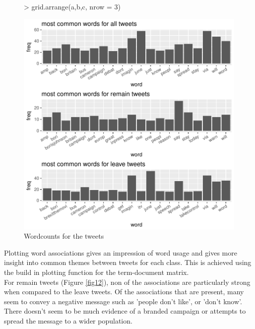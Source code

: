 \documentclass[10pt]{article}
\begin{document}
\begin{figure}[H]
\begin{center}
\begin{Schunk}
\begin{Sinput}
> grid.arrange(a,b,c, nrow = 3)
\end{Sinput}
\end{Schunk}
\includegraphics{submission-032}
\caption {Wordcounts for the tweets}
\label{fig10}
\end {center}
\end {figure}
\hspace{1cm} 
Plotting word associations gives an impression of word usage and gives more insight into common themes between tweets for each class. This is achieved using the build in plotting function for the term-document matrix.\\
For remain tweets (Figure \ref{fig12}), non of the associations are particularly strong when compared to the leave tweets. Of the associations that are present, many seem to convey a negative message such as 'people don't like', or 'don't know'. There doesn't seem to be much evidence of a branded campaign or attempts to spread the message to a wider population.
\end{document}
